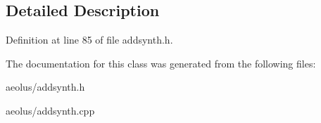 \subsection{Detailed Description}


Definition at line 85 of file addsynth.\+h.



The documentation for this class was generated from the following files\+:\begin{DoxyCompactItemize}
\item 
aeolus/addsynth.\+h\item 
aeolus/addsynth.\+cpp\end{DoxyCompactItemize}

